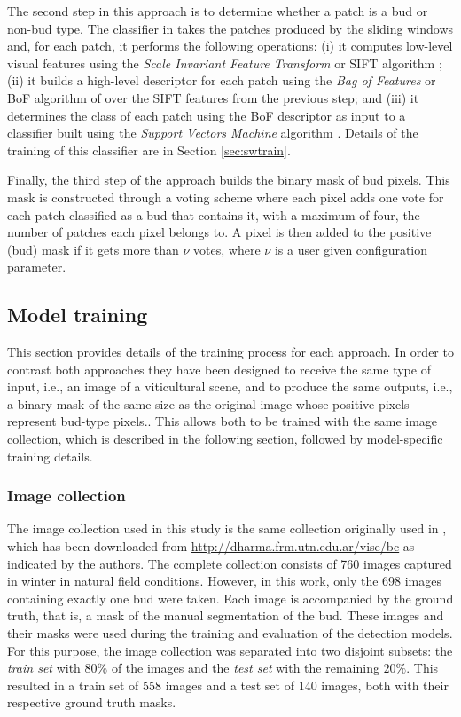 \documentclass[a4paper,authoryear,review]{elsarticle}
\begin{document}
	The second step in this approach is to determine whether a patch is a bud or non-bud type. The classifier in  \citet{perez2017image} takes the patches produced by the sliding windows and, for each patch, it performs the following operations: (i) it computes low-level visual features using the \emph{Scale Invariant Feature Transform} or SIFT algorithm \citep{lowe2004distinctive}; (ii) it builds a high-level descriptor for each patch using the \emph{Bag of Features} or BoF algorithm of \citet{csurka2004visual} over  the SIFT features from the previous step; and (iii) it determines the class of each patch using the BoF descriptor as input to a  classifier built using the \emph{Support Vectors Machine} algorithm \citep{vapnik2013nature}. Details of the training of this classifier are in Section \ref{sec:swtrain}.
	
	Finally, the third step of the approach builds the binary mask of bud pixels. This mask is constructed through a voting scheme where each pixel adds one vote for each patch classified as a bud that contains it, with a maximum of four, the number of patches each pixel belongs to. A pixel is then added to the positive (bud) mask if it gets more than $\nu$ votes, where $\nu$ is a user given configuration parameter.
	
	\subsection{Model training}
	\label{sec:train}
	
	This section provides details of the training process for each approach. In order to contrast both approaches they have been designed to receive the same type of input, i.e., an image of a viticultural scene, and to produce the same outputs, i.e., a binary mask of the same size as the original image whose positive pixels represent bud-type pixels.. This allows both to be trained with the same image collection, which is described in the following section, followed by model-specific training details.
	
	\subsubsection{Image collection}
	\label{sec:collection}
	
	The image collection used in this study is the same collection originally used in \citet{perez2017image}, which has been downloaded from \url{
		http://dharma.frm.utn.edu.ar/vise/bc} as indicated by the authors. The complete collection consists of 760 images captured in winter in natural field conditions. However, in this work, only the 698 images containing exactly one bud were taken. Each image is accompanied by the ground truth, that is, a mask of the  manual segmentation of the bud. These images and their masks were used during the training and evaluation of the detection models. For this purpose, the image collection was separated into two disjoint subsets: the \emph{train set} with $80\%$ of the images and the \emph{test set} with the remaining  $20\%$. This resulted in a train set of 558 images and a test set of 140 images, both with their respective ground truth masks.
\end{document}
